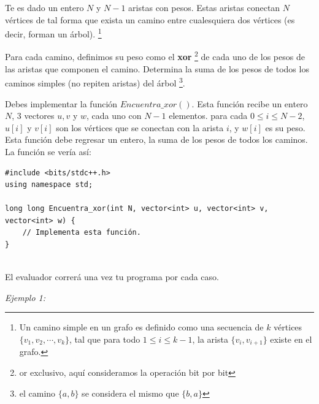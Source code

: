 \documentclass[12pt]{scrartcl}
\begin{document}
    
    
    \vspace{10pt}

    
    
        Te es dado un entero $N$ y $N - 1$ aristas con pesos. Estas aristas conectan $N$ vértices de tal forma que exista un camino entre cualesquiera dos vértices (es decir, forman un árbol).
        \footnote{Un camino simple en un grafo es definido como una secuencia de $k$ vértices $\{v_1, v_2, \cdots , v_k\}$, tal que para todo $1 \le i \le k - 1$, la arista $\{v_i, v_{i + 1}\}$ existe en el grafo. }
        
        Para cada camino, definimos su peso como el {\bfseries xor} \footnote{or exclusivo, aquí consideramos la operación bit por bit} de cada uno de los pesos de las aristas que componen el camino. Determina la suma de los pesos de todos los caminos simples (no repiten aristas) del árbol \footnote{el camino $\{a, b\}$ se considera el mismo que $\{b, a\}$}.
        

        Debes implementar la función $Encuentra\_xor()$. Esta función recibe un entero $N$, 3 vectores $u, v$ y $w$, cada uno con $N - 1$ elementos. para cada $0 \le i \le N - 2$, $u[i]$ y $v[i]$ son los vértices que se conectan con la arista $i$, y $w[i]$ es su peso. Esta función debe regresar un entero, la suma de los pesos de todos los caminos.
        La función se vería así:

\begin{verbatim}
#include <bits/stdc++.h>
using namespace std;

long long Encuentra_xor(int N, vector<int> u, vector<int> v, vector<int> w) {
    // Implementa esta función.
}
    
\end{verbatim}

    El evaluador correrá una vez tu programa por cada caso.


               
        {\itshape Ejemplo 1:}
        
\end{document}
